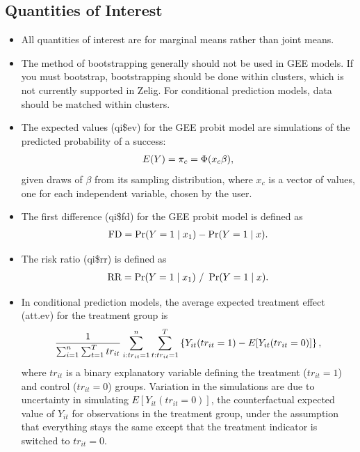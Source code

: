 \documentclass[letterpaper,10pt,english]{sphinxmanual}
\begin{document}
\subsection{Quantities of Interest}
\label{vignette:id129}\begin{itemize}
\item {} 
All quantities of interest are for marginal means rather than joint
means.

\item {} 
The method of bootstrapping generally should not be used in GEE
models. If you must bootstrap, bootstrapping should be done within
clusters, which is not currently supported in Zelig. For conditional
prediction models, data should be matched within clusters.

\item {} 
The expected values (qi\$ev) for the GEE probit model are simulations
of the predicted probability of a success:
\begin{gather}
\begin{split}E(Y) =
  \pi_{c}= \Phi(x_{c} \beta),\end{split}\notag
\end{gather}
given draws of \(\beta\) from its sampling distribution, where
\(x_{c}\) is a vector of values, one for each independent
variable, chosen by the user.

\item {} 
The first difference (qi\$fd) for the GEE probit model is defined as
\begin{gather}
\begin{split}\textrm{FD} = \Pr(Y = 1 \mid x_1) - \Pr(Y = 1 \mid x).\end{split}\notag
\end{gather}
\item {} 
The risk ratio (qi\$rr) is defined as
\begin{gather}
\begin{split}\textrm{RR} = \Pr(Y = 1 \mid x_1) \ / \ \Pr(Y = 1 \mid x).\end{split}\notag
\end{gather}
\item {} 
In conditional prediction models, the average expected treatment
effect (att.ev) for the treatment group is
\begin{gather}
\begin{split}\frac{1}{\sum_{i=1}^n \sum_{t=1}^T tr_{it}}\sum_{i:tr_{it}=1}^n \sum_{t:tr_{it}=1}^T \left\{ Y_{it}(tr_{it}=1) -
      E[Y_{it}(tr_{it}=0)] \right\},\end{split}\notag
\end{gather}
where \(tr_{it}\) is a binary explanatory variable defining the
treatment (\(tr_{it}=1\)) and control (\(tr_{it}=0\)) groups.
Variation in the simulations are due to uncertainty in simulating
\(E[Y_{it}(tr_{it}=0)]\), the counterfactual expected value of
\(Y_{it}\) for observations in the treatment group, under the
assumption that everything stays the same except that the treatment
indicator is switched to \(tr_{it}=0\).

\end{itemize}
\end{document}
